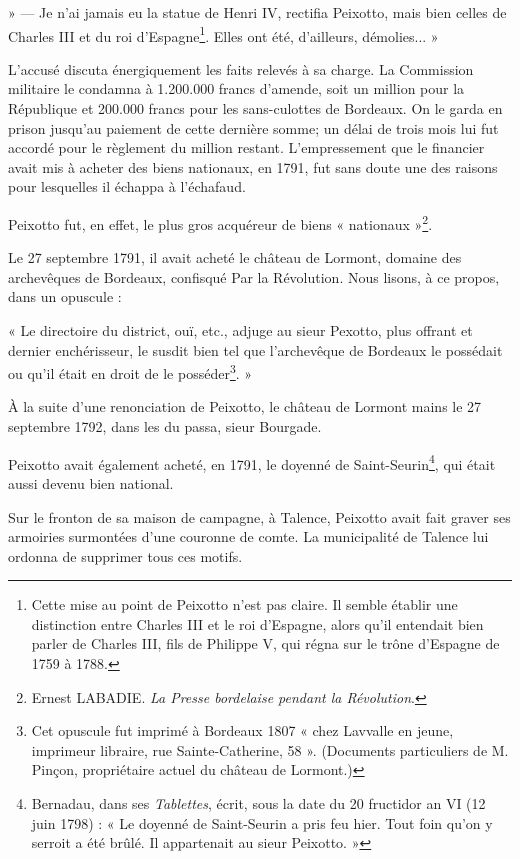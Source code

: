 » — Je n'ai jamais eu la statue de Henri IV, rectifia  Peixotto, mais bien celles de Charles III et du roi d'Espagne\footnote{Cette mise au point de Peixotto n'est pas claire. Il semble établir une distinction entre Charles III et le roi d'Espagne, alors qu'il entendait bien parler de Charles III, fils de Philippe V, qui régna sur le trône d'Espagne de 1759 à 1788.}. Elles ont été, d'ailleurs, démolies... »

L'accusé discuta énergiquement les faits relevés à sa charge. La Commission militaire le condamna à 1.200.000 francs d'amende, soit un million pour la République et 200.000 francs pour les sans-culottes de Bordeaux. On le garda en prison jusqu'au paiement de cette dernière somme; un délai de trois mois lui fut accordé pour le règlement du million restant. L'empressement que le financier avait mis à acheter des biens nationaux, en 1791, fut sans doute une des raisons pour lesquelles il échappa à l'échafaud.

Peixotto fut, en effet, le plus gros acquéreur de biens « nationaux »\footnote{Ernest LABADIE. \textit{La Presse bordelaise pendant la Révolution}.}.

Le 27 septembre 1791, il avait acheté le château de Lormont, domaine des archevêques de Bordeaux, confisqué Par la Révolution. Nous lisons, à ce propos, dans un opuscule :

« Le directoire du district, ouï, etc., adjuge au sieur Pexotto, plus offrant et dernier enchérisseur, le susdit bien tel que l'archevêque de Bordeaux le possédait ou qu'il était en droit de le posséder\footnote{Cet opuscule fut imprimé à Bordeaux 1807 « chez Lavvalle en jeune, imprimeur libraire, rue Sainte-Catherine, 58 ». (Documents particuliers de M. Pinçon, propriétaire actuel du château de Lormont.)}. »

À la suite d'une renonciation de Peixotto, le château de Lormont mains le 27 septembre 1792, dans les du passa, sieur Bourgade.

Peixotto avait également acheté, en 1791, le doyenné de Saint-Seurin\footnote{Bernadau, dans ses \textit{Tablettes}, écrit, sous la date du 20 fructidor an VI (12 juin 1798) : « Le doyenné de Saint-Seurin a pris feu hier. Tout foin qu'on y serroit a été brûlé. Il appartenait au sieur Peixotto. »}, qui était aussi devenu bien national.

Sur le fronton de sa maison de campagne, à Talence, Peixotto avait fait graver ses armoiries surmontées d'une couronne de comte. La municipalité de Talence lui ordonna de supprimer tous ces motifs.


